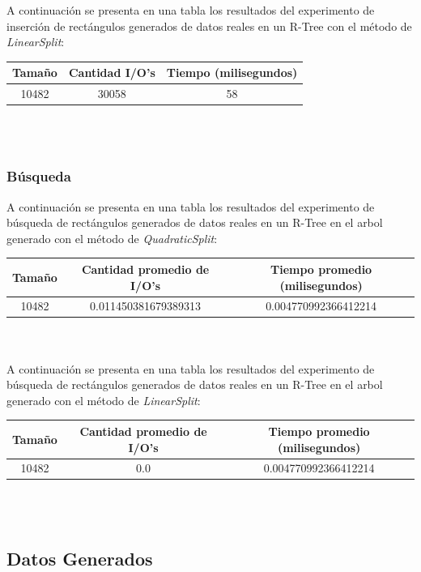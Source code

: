 \documentclass[letterpaper,12pt]{article}
\begin{document}
A continuaci\'on se presenta en una tabla los resultados del experimento de inserci\'on de rect\'angulos generados de datos reales en un R-Tree con el m\'etodo de \textit{LinearSplit}: \\
\begin{tabular}{|c|c|c|}
\hline
\textbf{Tama\~no} & \textbf{Cantidad I/O's} & \textbf{Tiempo (milisegundos)} \\
\hline
10482 & 30058 & 58 \\
\hline
\end{tabular}
\\ \\

\subsubsection{Búsqueda}
A continuaci\'on se presenta en una tabla los resultados del experimento de búsqueda de rect\'angulos generados de datos reales en un R-Tree en el arbol generado con el m\'etodo de \textit{QuadraticSplit}: \\
\begin{tabular}{|c|c|c|}
\hline
\textbf{Tama\~no} & \textbf{Cantidad promedio de I/O's} & \textbf{Tiempo promedio (milisegundos)} \\
\hline
10482 & 0.011450381679389313 & 0.004770992366412214 \\
\hline
\end{tabular}
\\ \\

A continuaci\'on se presenta en una tabla los resultados del experimento de búsqueda de rect\'angulos generados de datos reales en un R-Tree en el arbol generado con el m\'etodo de \textit{LinearSplit}: \\
\begin{tabular}{|c|c|c|}
\hline
\textbf{Tama\~no} & \textbf{Cantidad promedio de I/O's} & \textbf{Tiempo promedio (milisegundos)} \\
\hline
10482 & 0.0 & 0.004770992366412214 \\
\hline
\end{tabular}
\\ \\

\subsection{Datos Generados}
\end{document}
